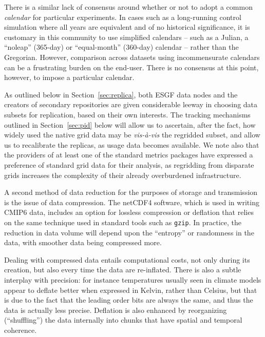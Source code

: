\documentclass[gmd,manuscript]{copernicus}
\begin{document}
There is a similar lack of consensus around whether or not to adopt a common \emph{calendar} for
particular experiments.
In cases such as a long-running control simulation where all years are
equivalent and of no historical significance, it is customary in this
community to use simplified calendars -- such as a Julian, a
``noleap'' (365-day) or ``equal-month'' (360-day) calendar -- rather
than the Gregorian. However,
comparison across datasets using incommensurate calendars can be a
frustrating burden on the end-user. There is no consensus at this
point, however, to impose a particular calendar.

As outlined below in Section~\ref{sec:replica}, both ESGF data nodes
and the creators of secondary repositories are given considerable
leeway in choosing data subsets for replication, based on their own
interests. The tracking mechanisms outlined in Section~\ref{sec:pid}
below will allow us to ascertain, after the fact, how widely used the
native grid data may be \emph{vis-\`a-vis} the regridded subset, and
allow us to recalibrate the replicas, as usage data becomes available.
We note also that the providers of at least one of the standard
metrics packages \citep[ESMValTool,][]{ref:eyringetal2016a} have
expressed a preference of standard grid data for their analysis, as
regridding from disparate grids increases the complexity of their
already overburdened infrastructure.

A second method of data reduction for the purposes of storage and
transmission is the issue of data compression. The netCDF4 software, which is 
used in writing CMIP6 data, includes an option for lossless
compression or deflation \citep{ref:zivlempel1977} that relies on the
same technique used in standard tools such as \texttt{gzip}. In
practice, the reduction in data volume will depend upon the
``entropy'' or randomness in the data, with smoother data being
compressed more.

Dealing with compressed data entails computational costs, not only during 
its creation, but also every time the data are re-inflated. There
is also a subtle interplay with precision: for instance temperatures
usually seen in climate models appear to deflate better when expressed
in Kelvin, rather than Celsius, but that is due to the fact that the
leading order bits are always the same, and thus the data is actually
less precise. Deflation is also enhanced by reorganizing
(``shuffling'') the data internally into chunks that have spatial and
temporal coherence.
\end{document}
